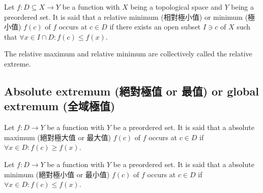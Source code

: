 \documentclass[a4paper,12pt]{report}
\begin{document}
Let $f\colon D\subseteq X\to Y$ be a function with $X$ being a topological space and $Y$ being a preordered set. It is said that a relative minimum (相對極小值) or minimum (極小值) \( f(c) \) of \(f\) occurs at $c\in D$ if there exists an open subset $I\ni c$ of $X$ such that \( \forall x\in I\cap D\colon f(c) \leq f(x) \).

The relative maximum and relative minimum are collectively called the relative extreme.
\subsection{Absolute extremum (絕對極值 or 最值) or global extremum (全域極值)}
Let $f\colon D\to Y$ be a function with $Y$ be a preordered set. It is said that a absolute maximum (絕對極大值 or 最大值) \( f(c) \) of \(f\) occurs at $c\in D$ if \( \forall x\in D\colon f(c) \geq f(x) \).

Let $f\colon D\to Y$ be a function with $Y$ be a preordered set. It is said that a absolute minimum (絕對極小值 or 最小值) \( f(c) \) of \(f\) occurs at $c\in D$ if \( \forall x\in D\colon f(c) \leq f(x) \).
\end{document}
